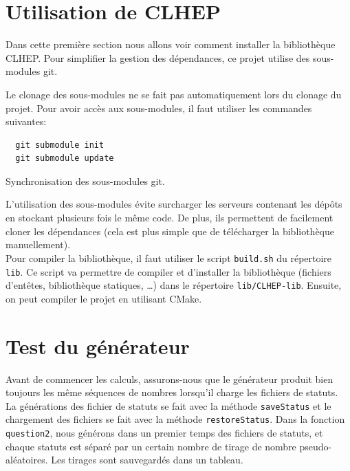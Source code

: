 \documentclass[a4paper]{article}
\begin{document}
\clearpage

\section{Utilisation de CLHEP}

Dans cette première section nous allons voir comment installer la bibliothèque
CLHEP. Pour simplifier la gestion des dépendances, ce projet utilise des
sous-modules git.

Le clonage des sous-modules ne se fait pas automatiquement lors du clonage du
projet. Pour avoir accès aux sous-modules, il faut utiliser les commandes
suivantes:

\begin{listing}[ht!]
\begin{verbatim}
  git submodule init
  git submodule update
\end{verbatim}
\caption{Synchronisation des sous-modules git.}
\label{lable}
\end{listing}

L'utilisation des sous-modules évite surcharger les serveurs contenant les
dépôts en stockant plusieurs fois le même code. De plus, ils permettent de
facilement cloner les dépendances (cela est plus simple que de télécharger la
bibliothèque manuellement).\\

Pour compiler la bibliothèque, il faut utiliser le script \lstinline{build.sh}
du répertoire \lstinline{lib}. Ce script va permettre de compiler et d'installer
la bibliothèque (fichiers d'entêtes, bibliothèque statiques, \dots) dans le
répertoire \lstinline{lib/CLHEP-lib}. Ensuite, on peut compiler le projet en
utilisant CMake.

\section{Test du générateur}

Avant de commencer les calculs, assurons-nous que le générateur produit bien
toujours les même séquences de nombres lorsqu'il charge les fichiers de
statuts.\\

La générations des fichier de statuts se fait avec la méthode
\lstinline{saveStatus} et le chargement des fichiers se fait avec la méthode
\lstinline{restoreStatus}. Dans la fonction \lstinline{question2}, nous générons
dans un premier temps des fichiers de statuts, et chaque statuts est séparé par
un certain nombre de tirage de nombre pseudo-aléatoires. Les tirages sont
sauvegardés dans un tableau.
\end{document}
